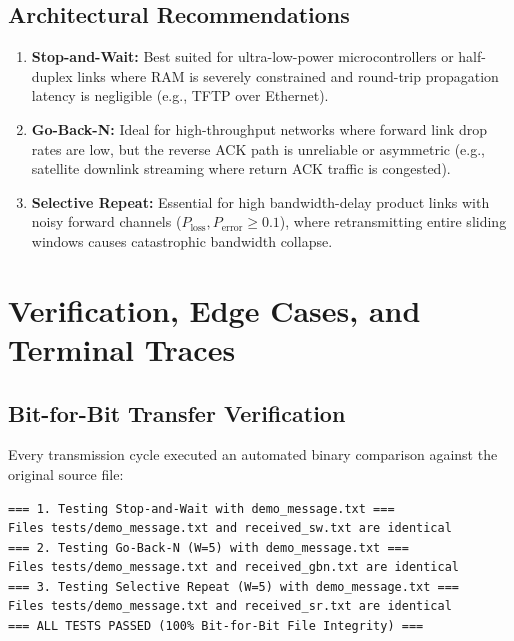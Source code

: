 \documentclass[11pt,a4paper]{article}
\begin{document}
\subsection{Architectural Recommendations}
\begin{enumerate}
    \item \textbf{Stop-and-Wait:} Best suited for ultra-low-power microcontrollers or half-duplex links where RAM is severely constrained and round-trip propagation latency is negligible (e.g., TFTP over Ethernet).
    \item \textbf{Go-Back-N:} Ideal for high-throughput networks where forward link drop rates are low, but the reverse ACK path is unreliable or asymmetric (e.g., satellite downlink streaming where return ACK traffic is congested).
    \item \textbf{Selective Repeat:} Essential for high bandwidth-delay product links with noisy forward channels ($P_{\text{loss}}, P_{\text{error}} \ge 0.1$), where retransmitting entire sliding windows causes catastrophic bandwidth collapse.
\end{enumerate}

\FloatBarrier
\section{Verification, Edge Cases, and Terminal Traces}

\subsection{Bit-for-Bit Transfer Verification}
Every transmission cycle executed an automated binary comparison against the original source file:
\begin{lstlisting}[caption={Integrity Verification across Protocols}]
=== 1. Testing Stop-and-Wait with demo_message.txt ===
Files tests/demo_message.txt and received_sw.txt are identical
=== 2. Testing Go-Back-N (W=5) with demo_message.txt ===
Files tests/demo_message.txt and received_gbn.txt are identical
=== 3. Testing Selective Repeat (W=5) with demo_message.txt ===
Files tests/demo_message.txt and received_sr.txt are identical
=== ALL TESTS PASSED (100% Bit-for-Bit File Integrity) ===
\end{lstlisting}
\end{document}
